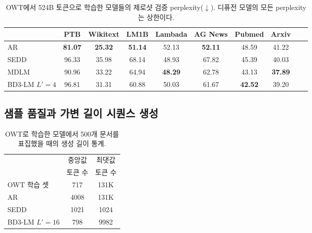 \documentclass{article} %
\def\algo{BD3-LM}
\def\owt{OWT}
\begin{document}
\begin{table}[ht]
\small
\caption{\owt{}에서 524B 토큰으로 학습한 모델들의 제로샷 검증 perplexity($\downarrow$). 디퓨전 모델의 모든 perplexity는 상한이다.
}
\small
\label{zeroshot-ppl}
\centering
\begin{tabular}{lccccccccc}
\toprule
& PTB & Wikitext & LM1B & Lambada  & AG News & Pubmed & Arxiv\\
\midrule
AR &\textbf{81.07}& \textbf{25.32}& \textbf{51.14} & 52.13 & \textbf{52.11} & 48.59 & 41.22\\
\midrule
SEDD  & 96.33 & 35.98 & 68.14& 48.93 & 67.82 & 45.39 & 40.03\\
MDLM  &90.96& 33.22& 64.94& \textbf{48.29} & 62.78 & 43.13 & \textbf{37.89}\\
\algo{} $L'=4$ & 96.81 & 31.31 & 60.88 & 50.03 & 61.67 & \textbf{42.52} & 39.20\\

\bottomrule
\end{tabular}
\end{table}

\subsection{샘플 품질과 가변 길이 시퀀스 생성}\label{subsec:samples}

\begin{table}
    \small
    \vspace{-10pt}
  \caption{OWT로 학습한 모델에서 500개 문서를 표집했을 때의 생성 길이 통계.}
  \label{tab:owt-gen-lens}
  \centering
    \setlength{\tabcolsep}{2pt} %

  \begin{tabular}{lcc}

    \toprule
    & 중앙값  & 최댓값 \\
    & 토큰 수  & 토큰 수 \\

    \midrule
    OWT 학습 셋  & 717 & 131K\\
    AR  & 4008 & 131K \\
    \midrule
    SEDD & 1021 & 1024 \\
    \algo{} $L'=16$ & 798 & 9982\\
    \bottomrule
  \end{tabular}
  \vspace{-5pt}
\end{table}
\end{document}

